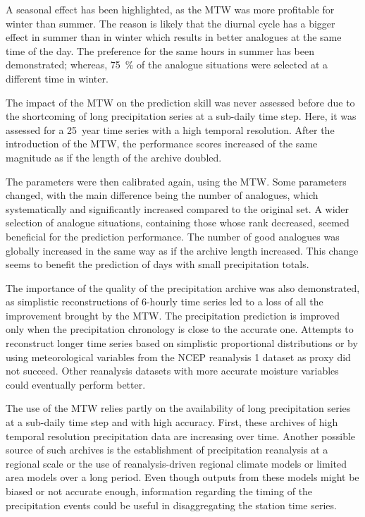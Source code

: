 \documentclass[hess, manuscript]{copernicus}
\begin{document}
	A seasonal effect has been highlighted, as the MTW was more profitable for winter than summer. The reason is likely that the diurnal cycle has a bigger effect in summer than in winter which results in better analogues at the same time of the day. The preference for the same hours in summer has been demonstrated; whereas, 75~\% of the analogue situations were selected at a different time in winter.
	
	The impact of the MTW on the prediction skill was never assessed before due to the shortcoming of long precipitation series at a sub-daily time step. Here, it was assessed for a 25~year time series with a high temporal resolution. After the introduction of the MTW, the performance scores increased of the same magnitude as if the length of the archive doubled.
	
	The parameters were then calibrated again, using the MTW. Some parameters changed, with the main difference being the number of analogues, which systematically and significantly increased compared to the original set. A wider selection of analogue situations, containing those whose rank decreased, seemed beneficial for the prediction performance. The number of good analogues was globally increased in the same way as if the archive length increased. This change seems to benefit the prediction of days with small precipitation totals.
	
	The importance of the quality of the precipitation archive was also demonstrated, as simplistic reconstructions of 6-hourly time series led to a loss of all the improvement brought by the MTW. The precipitation prediction is improved only when the precipitation chronology is close to the accurate one. Attempts to reconstruct longer time series based on simplistic proportional distributions or by using meteorological variables from the NCEP reanalysis 1 dataset as proxy did not succeed. Other reanalysis datasets with more accurate moisture variables could eventually perform better.
	
	The use of the MTW relies partly on the availability of long precipitation series at a sub-daily time step and with high accuracy. First, these archives of high temporal resolution precipitation data are increasing over time. Another possible source of such archives is the establishment of precipitation reanalysis at a regional scale or the use of reanalysis-driven regional climate models or limited area models over a long period. Even though outputs from these models might be biased or not accurate enough, information regarding the timing of the precipitation events could be useful in disaggregating the station time series.
	
\end{document}
